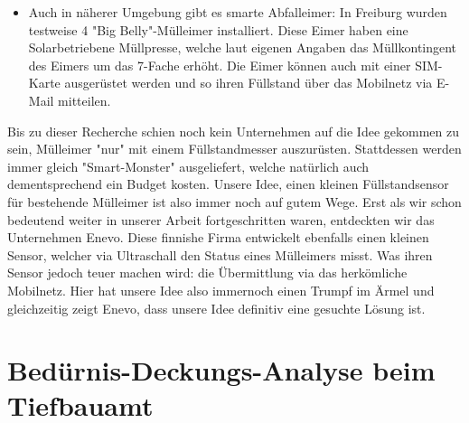 \begin{itemize}
  \item Auch in näherer Umgebung gibt es smarte Abfalleimer: In Freiburg wurden testweise 4 "Big Belly"-Mülleimer installiert\autocite{market:BigBelly}. Diese Eimer haben eine Solarbetriebene Müllpresse, welche laut eigenen Angaben das Müllkontingent des Eimers um das 7-Fache erhöht. Die Eimer können auch mit einer SIM-Karte ausgerüstet werden und so ihren Füllstand über das Mobilnetz via E-Mail mitteilen.
\end{itemize}

Bis zu dieser Recherche schien noch kein Unternehmen auf die Idee gekommen zu sein, Mülleimer "nur" mit einem Füllstandmesser auszurüsten. Stattdessen werden immer gleich "Smart-Monster" ausgeliefert, welche natürlich auch dementsprechend ein Budget kosten. Unsere Idee, einen kleinen Füllstandsensor für bestehende Mülleimer ist also immer noch auf gutem Wege. Erst als wir schon bedeutend weiter in unserer Arbeit fortgeschritten waren, entdeckten wir das Unternehmen Enevo\autocite{market:Enevo}. Diese finnishe Firma entwickelt ebenfalls einen kleinen Sensor, welcher via Ultraschall den Status eines Mülleimers misst. Was ihren Sensor jedoch teuer machen wird: die Übermittlung via das herkömliche Mobilnetz. Hier hat unsere Idee also immernoch einen Trumpf im Ärmel und gleichzeitig zeigt Enevo, dass unsere Idee definitiv eine gesuchte Lösung ist.

\section{Bedürnis-Deckungs-Analyse beim Tiefbauamt}

